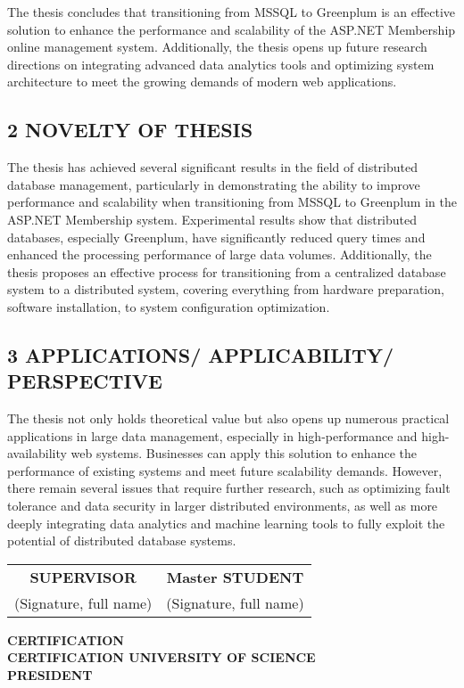 The thesis concludes that transitioning from MSSQL to Greenplum is an effective solution to enhance the performance and scalability of the ASP.NET Membership online management system. Additionally, the thesis opens up future research directions on integrating advanced data analytics tools and optimizing system architecture to meet the growing demands of modern web applications.


\subsection*{2 NOVELTY OF THESIS}
The thesis has achieved several significant results in the field of distributed database management, particularly in demonstrating the ability to improve performance and scalability when transitioning from MSSQL to Greenplum in the ASP.NET Membership system. Experimental results show that distributed databases, especially Greenplum, have significantly reduced query times and enhanced the processing performance of large data volumes. Additionally, the thesis proposes an effective process for transitioning from a centralized database system to a distributed system, covering everything from hardware preparation, software installation, to system configuration optimization.


\subsection*{3 APPLICATIONS/ APPLICABILITY/ PERSPECTIVE}

The thesis not only holds theoretical value but also opens up numerous practical applications in large data management, especially in high-performance and high-availability web systems. Businesses can apply this solution to enhance the performance of existing systems and meet future scalability demands. However, there remain several issues that require further research, such as optimizing fault tolerance and data security in larger distributed environments, as well as more deeply integrating data analytics and machine learning tools to fully exploit the potential of distributed database systems.

\begin{center}
    \begin{tabular}{c c}
        \textbf{SUPERVISOR} & \textbf{Master STUDENT} \\
        (Signature, full name) & (Signature, full name) \\
    \end{tabular}
    
    \vspace{6cm} %
    
    \textbf{CERTIFICATION} \\
    \textbf{CERTIFICATION UNIVERSITY OF SCIENCE} \\
    \textbf{PRESIDENT}
\end{center}

\pagebreak